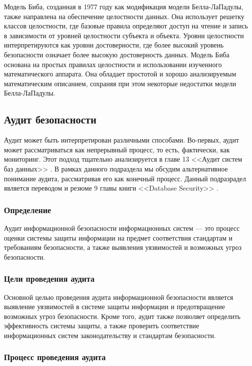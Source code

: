 Модель Биба, созданная в 1977 году как модификация модели Белла-ЛаПадулы, также направлена на обеспечение целостности данных. Она использует решетку классов целостности, где базовые правила определяют доступ на чтение и запись в зависимости от уровней целостности субъекта и объекта. Уровни целостности интерпретируются как уровни достоверности, где более высокий уровень безопасности означает более высокую достоверность данных. Модель Биба основана на простых правилах целостности и использовании изученного математического аппарата. Она обладает простотой и хорошо анализируемым математическим описанием, сохраняя при этом некоторые недостатки модели Белла-ЛаПадулы.

\subsection{Аудит безопасности}

Аудит может быть интерпретирован различными способами. Во-первых, аудит может рассматриваться как непрерывный процесс, то есть, фактически, как мониторинг. Этот подход тщательно анализируется в главе 13 <<Аудит систем баз данных>> \autocite{Smirnov2007}.
В рамках данного подраздела мы обсудим альтернативное понимание аудита, рассматривая его как конечный процесс. Данный подразрадел является переводом и резюме 9 главы книги <<Database Security>> \autocite{DatabaseSecurity}.

\subsubsection{Определение}

Аудит информационной безопасности информационных систем — это процесс оценки системы защиты информации на предмет соответствия стандартам и требованиям безопасности, а также выявления уязвимостей и возможных угроз безопасности.

\subsubsection{Цели проведения аудита}

Основной целью проведения аудита информационной безопасности является выявление уязвимостей в системе защиты информации и предотвращение возможных угроз безопасности. Кроме того, аудит также позволяет определить эффективность системы защиты, а также проверить соответствие информационных систем законодательству и стандартам безопасности.

\subsubsection{Процесс проведения аудита}

